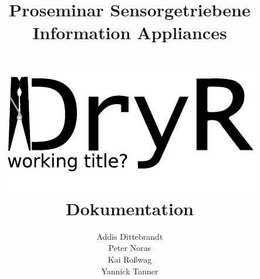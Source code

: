 \documentclass[ngerman,parskip=full]{article}
\title{ \Huge{\textbf{Proseminar Sensorgetriebene Information Appliances}}  
	\\ \textbf{}
	\\ \includegraphics{logo.pdf}
	\\ [20pt] \huge{\textbf{Dokumentation}}}
\author{Addis Dittebrandt \\ Peter Noras \\ Kai Roßwag \\ Yannick Tanner}
\begin{document}
	\begin{titlepage}

		\maketitle
		\thispagestyle{empty}
		\newpage

	\end{titlepage}

	\tableofcontents 
	\newpage

	
	
\end{document}
